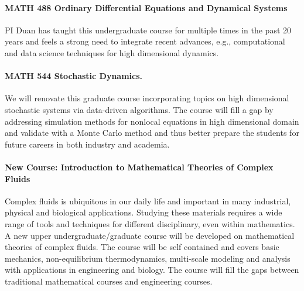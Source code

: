 \documentclass[11pt]{NSFamsart}
\newcommand{\bfparagraph}[1]{\paragraph{\textbf{\textup{#1}}}}
\begin{document}
\bfparagraph{MATH 488 Ordinary Differential Equations and Dynamical Systems} PI Duan has taught this undergraduate course for multiple  times in the past 20 years and feels  a strong need  to integrate recent advances, e.g., computational and data science techniques for high dimensional dynamics. 

\bfparagraph{MATH 544 Stochastic Dynamics.}
We will renovate this graduate course  incorporating topics on  high dimensional stochastic systems via data-driven algorithms.  The course will fill a gap by addressing simulation methods for nonlocal equations in high dimensional domain and validate with a Monte Carlo  method and thus better prepare the students for future careers in both industry and academia.
 

\bfparagraph{New Course: Introduction to Mathematical Theories of Complex Fluids} 
Complex fluids is ubiquitous in our daily life and important in many industrial, physical and biological applications. Studying these materials requires a wide range 
of tools and techniques for different disciplinary, even within mathematics. A new upper undergraduate/graduate course will be developed on mathematical theories of complex fluids. The course will be self contained and covers basic mechanics, non-equilibrium thermodynamics, multi-scale modeling and analysis with applications in engineering and biology. The course will fill the gaps between traditional mathematical courses and engineering courses.


 
\end{document}
